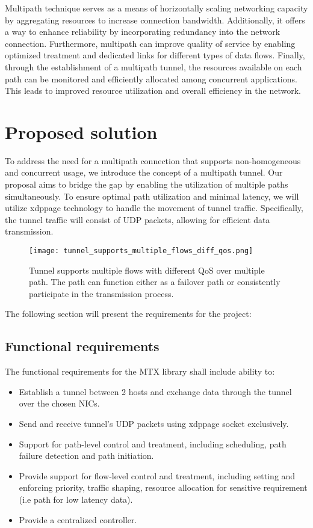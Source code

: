 Multipath technique serves as a means of horizontally scaling networking capacity by aggregating resources to increase connection bandwidth. 
Additionally, it offers a way to enhance reliability by incorporating redundancy into the network connection. Furthermore, multipath can improve quality of service by enabling optimized treatment and dedicated links for different types of data flows.
Finally, through the establishment of a multipath tunnel, the resources available on each path can be monitored and efficiently allocated among concurrent applications. 
This leads to improved resource utilization and overall efficiency in the network.

\section{Proposed solution}\label{sec:reqs:proposed_solution}
To address the need for a multipath connection that supports non-homogeneous and concurrent usage, we introduce the concept of a multipath tunnel. 
Our proposal aims to bridge the gap by enabling the utilization of multiple paths simultaneously.
To ensure optimal path utilization and minimal latency, we will utilize \ac{xdppage} technology to handle the movement of tunnel traffic. 
Specifically, the tunnel traffic will consist of UDP packets, allowing for efficient data transmission.

\begin{figure}[H]
	\centering
	\texttt{[image: tunnel\_supports\_multiple\_flows\_diff\_qos.png]}
	\caption{Tunnel supports multiple flows with different QoS over multiple path. The path can function either as a failover path or consistently participate in the transmission process.}\label{fig:reqs:tunnel_supports_multiple_flows_diff_qos}
\end{figure}

The following section will present the requirements for the project:

\subsection{Functional requirements}
The functional requirements for the \ac{MTX} library shall include ability to:
\begin{itemize}
    \item Establish a tunnel between 2 hosts and exchange data through the tunnel over the chosen \ac{NIC}s.
    \item Send and receive tunnel's UDP packets using \ac{xdppage} socket exclusively.
    \item Support for path-level control and treatment, including scheduling, path failure detection and path initiation.
    \item Provide support for flow-level control and treatment, including setting and enforcing priority, traffic shaping, resource allocation for sensitive requirement (i.e path for low latency data).
    \item Provide a centralized controller.
\end{itemize}


